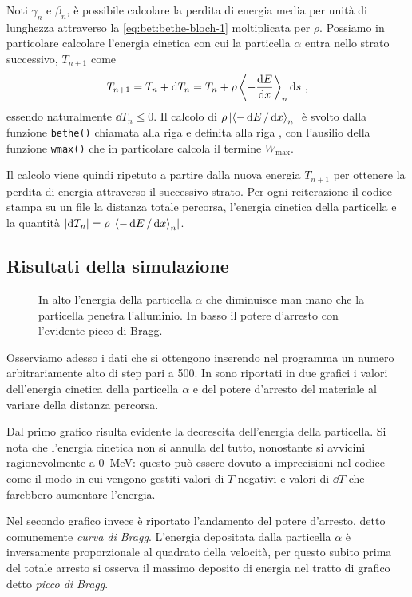         Noti $\gamma_n$ e $\beta_n$, è possibile calcolare la perdita di energia media per unità di lunghezza attraverso la \eqref{eq:bet:bethe-bloch-1} moltiplicata per $\rho$. Possiamo in particolare calcolare l'energia cinetica con cui la particella $\alpha$ entra nello strato successivo, $T_{n + 1}$ come
        \begin{equation*}
            T_{n + 1} = T_n + \dd{T_n} = T_n + \rho\, {\left\langle - \dv{E}{x} \right\rangle}_n \dd{s}
            \,,
        \end{equation*}
        essendo naturalmente $\dd{T_n} \leq 0$. Il calcolo di $\rho\,\abs{{\left\langle - \dd{E} / \dd{x} \right\rangle}_n}$ è svolto dalla funzione \texttt{bethe()} chiamata alla riga  e definita alla riga , con l'ausilio della funzione \texttt{wmax()} che in particolare calcola il termine $W_\text{max}$.

        Il calcolo viene quindi ripetuto a partire dalla nuova energia $T_{n + 1}$ per ottenere la perdita di energia attraverso il successivo strato. Per ogni reiterazione il codice stampa su un file la distanza totale percorsa, l'energia cinetica della particella e la quantità $\abs{\dd{T_n}} = \rho\,\abs{{\left\langle - \dd{E} / \dd{x} \right\rangle}_n}$.

    \subsection{Risultati della simulazione}
        \begin{figure}
            \centering
            
            
            \caption{In alto l'energia della particella $\alpha$ che diminuisce man mano che la particella penetra l'alluminio. In basso il potere d'arresto con l'evidente picco di Bragg.}
            \label{fig:bet:alpha}
        \end{figure}
        Osserviamo adesso i dati che si ottengono inserendo nel programma un numero arbitrariamente alto di step pari a \num{500}. In  sono riportati in due grafici i valori dell'energia cinetica della particella $\alpha$ e del potere d'arresto del materiale al variare della distanza percorsa.
        
        Dal primo grafico risulta evidente la decrescita dell'energia della particella. Si nota che l'energia cinetica non si annulla del tutto, nonostante si avvicini ragionevolmente a \SI{0}{\mega\eV}: questo può essere dovuto a imprecisioni nel codice come il modo in cui vengono gestiti valori di $T$ negativi e valori di $\dd{T}$ che farebbero aumentare l'energia.

        Nel secondo grafico invece è riportato l'andamento del potere d'arresto, detto comunemente \emph{curva di Bragg}. L'energia depositata dalla particella $\alpha$ è inversamente proporzionale al quadrato della velocità, per questo subito prima del totale arresto si osserva il massimo deposito di energia nel tratto di grafico detto \emph{picco di Bragg}.